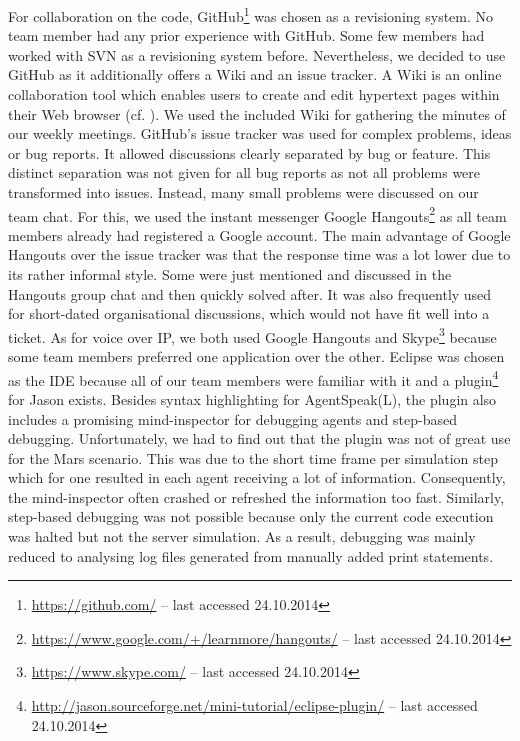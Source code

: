 For collaboration on the code, GitHub\footnote{\url{https://github.com/} -- last accessed 24.10.2014} was chosen as a revisioning system. %
No team member had any prior experience with GitHub.
Some few members had worked with SVN as a revisioning system before.
Nevertheless, we decided to use GitHub as it additionally offers a Wiki and an issue tracker.
A Wiki is an online collaboration tool which enables users to create and edit hypertext pages within their Web browser (cf. \cite{leuf_wiki_2001}).
We used the included Wiki for gathering the minutes of our weekly meetings.
GitHub's issue tracker was used for complex problems, ideas or bug reports.
It allowed discussions clearly separated by bug or feature.
This distinct separation was not given for all bug reports as not all problems were transformed into issues.
Instead, many small problems were discussed on our team chat.
For this, we used the instant messenger Google Hangouts\footnote{\url{https://www.google.com/+/learnmore/hangouts/} -- last accessed 24.10.2014} as all team members already had registered a Google account. %
The main advantage of Google Hangouts over the issue tracker was that the response time was a lot lower due to its rather informal style.
Some were just mentioned and discussed in the Hangouts group chat and then quickly solved after.
It was also frequently used for short-dated organisational discussions, which would not have fit well into a ticket.
As for voice over IP, we both used Google Hangouts and Skype\footnote{\url{https://www.skype.com/} -- last accessed 24.10.2014} because some team members preferred one application over the other.
Eclipse was chosen as the IDE because all of our team members were familiar with it and a plugin\footnote{\url{http://jason.sourceforge.net/mini-tutorial/eclipse-plugin/} -- last accessed 24.10.2014} for Jason exists.
Besides syntax highlighting for AgentSpeak(L), the plugin also includes a promising mind-inspector for debugging agents and step-based debugging.
Unfortunately, we had to find out that the plugin was not of great use for the Mars scenario.
This was due to the short time frame per simulation step which for one resulted in each agent receiving a lot of information.
Consequently, the mind-inspector often crashed or refreshed the information too fast.
Similarly, step-based debugging was not possible because only the current code execution was halted but not the server simulation.
As a result, debugging was mainly reduced to analysing log files generated from manually added print statements.
